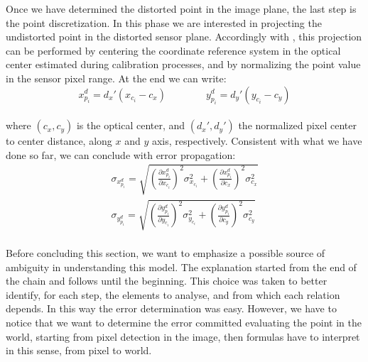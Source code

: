 \bigskip
Once we have determined the distorted point in the image plane, the last step is the point discretization. In this phase we are interested in projecting the undistorted point in the distorted sensor plane. Accordingly with \cite{TsaiTvLenses}, this projection can be performed by centering the coordinate reference system in the optical center estimated during calibration processes, and by normalizing the point value in the sensor pixel range. At the end we can write:
  \begin{equation*}
    x_{p_i}^d = d_x'(x_{c_i} - c_x) \qquad \qquad y_{p_i}^d = d_y'(y_{c_i} - c_y)
  \end{equation*} \\
where $(c_x, c_y)$ is the optical center, and $(d_x', d_y')$ the normalized pixel center to center distance, along $x$ and $y$ axis, respectively. Consistent with what we have done so far, we can conclude with error propagation:
  \begin{equation}
    \begin{matrix}
    \sigma_{x_{p_i}^d} = \sqrt{
      \left( \frac{\partial x_{p_i}^d}{\partial x_{c_i}} \right)^2 \sigma_{x_{c_i}}^2
      + \left( \frac{\partial x_{p_i}^d}{\partial c_x} \right)^2 \sigma_{c_x}^2
    }
  \\
    \sigma_{y_{p_i}^d} = \sqrt{
      \left( \frac{\partial y_{p_i}^d}{\partial y_{c_i}} \right)^2 \sigma_{y_{c_i}}^2
      + \left( \frac{\partial y_{p_i}^d}{\partial c_y} \right)^2 \sigma_{c_y}^2
    }
    \end{matrix}
    \label{eq:model:err:disc}
  \end{equation} \\

\bigskip
Before concluding this section, we want to emphasize a possible source of ambiguity in understanding this model. The explanation started from the end of the chain and follows until the beginning. This choice was taken to better identify, for each step, the elements to analyse, and from which each relation depends. In this way the error determination was easy. However, we have to notice that we want to determine the error committed evaluating the point in the world, starting from pixel detection in the image, then formulas have to interpret in this sense, from pixel to world.
